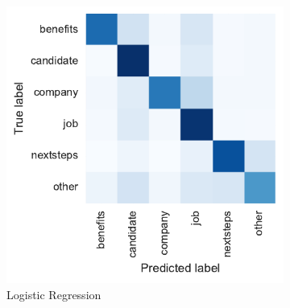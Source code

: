 \begin{figure}[h]
    \centering
    \begin{subfigure}[b]{0.365\textwidth}
        \includegraphics[width=\textwidth]{img/exp-vector-space/bom-conf-matrix-logreg-normalized.pdf}
        \caption{Logistic Regression}
\label{fig:bom-conf-matrix-logreg-normalized}
    \end{subfigure}
    \begin{subfigure}[b]{0.27\textwidth}

\end{subfigure}
\end{figure}
